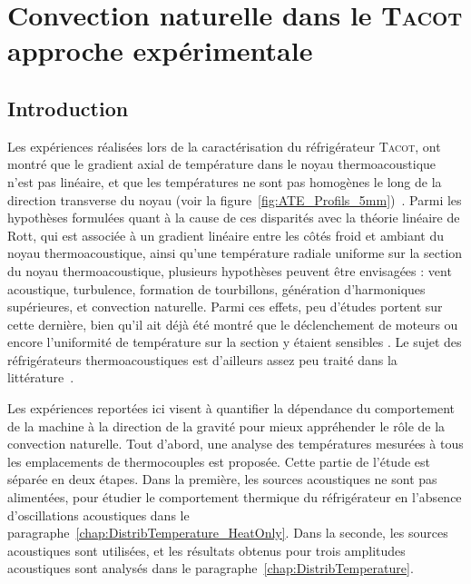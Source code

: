 \chapter[Convection naturelle dans le \textsc{Tacot} -- approche expérimentale]{Convection naturelle dans le \textsc{Tacot}\\approche expérimentale}\label{chap:EtudeExpe}
\mylocaltoc

\section{Introduction}\label{chap:EtudeExpe_Intro}
Les expériences réalisées lors de la caractérisation du réfrigérateur \textsc{Tacot}, ont montré que le gradient axial de température dans le noyau thermoacoustique n'est pas linéaire, et que les températures ne sont pas homogènes le long de la direction transverse du noyau (voir la figure~\ref{fig:ATE_Profils_5mm})~\cite{ramadan_design_2021}. Parmi les hypothèses formulées quant à la cause de ces disparités avec la théorie linéaire de Rott, qui est associée à un gradient linéaire entre les côtés froid et ambiant du noyau thermoacoustique, ainsi qu'une température radiale uniforme sur la section du noyau thermoacoustique, plusieurs hypothèses peuvent être envisagées : vent acoustique, turbulence, formation de tourbillons, génération d'harmoniques supérieures, et convection naturelle. Parmi ces effets, peu d'études portent sur cette dernière, bien qu'il ait déjà été montré que le déclenchement de moteurs ou encore l'uniformité de température sur la section y étaient sensibles \cite{ross_influence_2003,  hireche_numerical_2019, ramadan_experimental_2018}. Le sujet des réfrigérateurs thermoacoustiques est d'ailleurs assez peu traité dans la littérature~\cite{zhang_novel_2011, babaei_investigation_2010}.\smallskip

Les expériences reportées ici visent à quantifier la dépendance du comportement de la machine à la direction de la gravité pour mieux appréhender le rôle de la convection naturelle. Tout d'abord, une analyse des températures mesurées à tous les emplacements de thermocouples est proposée. Cette partie de l'étude est séparée en deux étapes. Dans la première, les sources acoustiques ne sont pas alimentées, pour étudier le comportement thermique du réfrigérateur en l'absence d'oscillations acoustiques dans le paragraphe~\ref{chap:DistribTemperature_HeatOnly}. Dans la seconde, les sources acoustiques sont utilisées, et les résultats obtenus pour trois amplitudes acoustiques sont analysés dans le paragraphe~\ref{chap:DistribTemperature}.\smallskip

